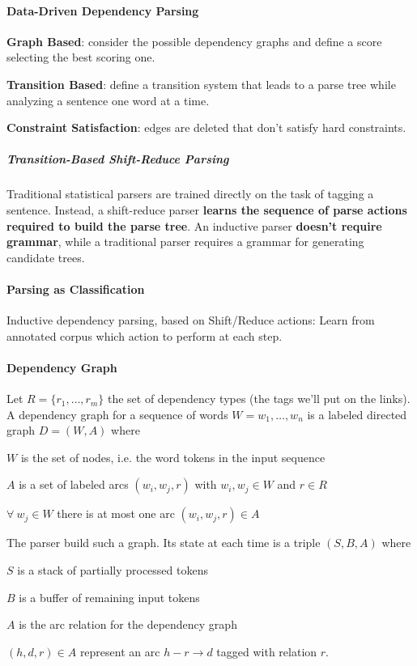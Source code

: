 \documentclass[10pt]{report}
\begin{document}
\paragraph{Data-Driven Dependency Parsing}
\begin{list}{}{}
	\item \textbf{Graph Based}: consider the possible dependency graphs and define a score selecting the best scoring one.
	\item \textbf{Transition Based}: define a transition system that leads to a parse tree while analyzing a sentence one word at a time.
	\item \textbf{Constraint Satisfaction}: edges are deleted that don't satisfy hard constraints.
\end{list}
\subparagraph{Transition-Based Shift-Reduce Parsing}
Traditional statistical parsers are trained directly on the task of tagging a sentence. Instead, a shift-reduce parser \textbf{learns the sequence of parse actions required to build the parse tree}. An inductive parser \textbf{doesn't require grammar}, while a traditional parser requires a grammar for generating candidate trees.
\paragraph{Parsing as Classification} Inductive dependency parsing, based on Shift/Reduce actions: Learn from annotated corpus which action to perform at each step.
\paragraph{Dependency Graph} Let $R = \{r_1,\ldots,r_m\}$ the set of dependency types (the tags we'll put on the links).\\
A dependency graph for a sequence of words $W = w_1,\ldots,w_n$ is a labeled directed graph $D = (W,A)$ where\begin{list}{}{}
	\item $W$ is the set of nodes, i.e. the word tokens in the input sequence
	\item $A$ is a set of labeled arcs $(w_i, w_j, r)$ with $w_i,w_j\in W$ and $r \in R$
	\item $\forall\:w_j\in W$ there is at most one arc $(w_i, w_j, r)\in A$
\end{list}
The parser build such a graph. Its state at each time is a triple $(S, B, A)$ where
\begin{list}{}{}
	\item $S$ is a stack of partially processed tokens
	\item $B$ is a buffer of remaining input tokens
	\item $A$ is the arc relation for the dependency graph
\end{list}
$(h,d,r)\in A$ represent an arc $h-r\rightarrow d$ tagged with relation $r$.
\end{document}
